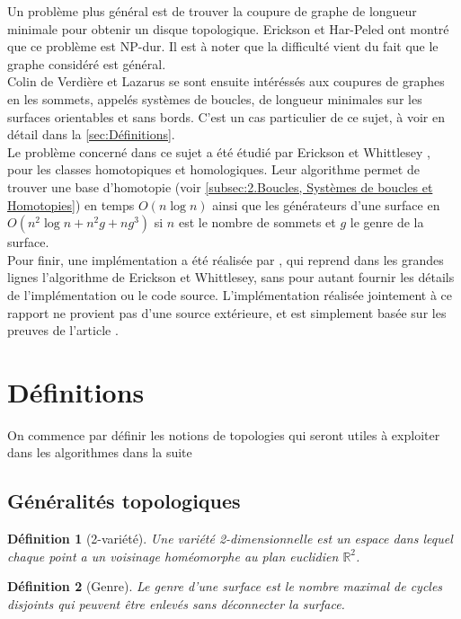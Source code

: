 \documentclass[french]{article}
\newtheorem{Def}{Définition}[section]
\begin{document}
Un problème plus général est de trouver la coupure de graphe de longueur minimale pour obtenir un disque topologique.
Erickson et Har-Peled ont montré que ce problème est NP-dur. Il est à noter que la difficulté vient du fait que le graphe considéré est général. \\
Colin de Verdière et Lazarus \cite{loops} se sont ensuite intéréssés aux coupures de graphes en les sommets, appelés systèmes de boucles, de longueur minimales sur les surfaces orientables et sans bords.
C'est un cas particulier de ce sujet, à voir en détail dans la \autoref{sec:Définitions}. \\
Le problème concerné dans ce sujet a été étudié par Erickson et Whittlesey \cite{erickson_whittlesey}, pour les classes homotopiques et homologiques. 
Leur algorithme permet de trouver une base d'homotopie (voir \autoref{subsec:2.Boucles, Systèmes de boucles et Homotopies}) en temps $O(n \log n)$ ainsi que les générateurs d'une surface en $O(n^2 \log n + n^2g + ng^3)$ si $n$ est le nombre de sommets et $g$ le genre de la surface. \\
Pour finir, une implémentation a été réalisée par \cite{implementation}, qui reprend dans les grandes lignes l'algorithme de Erickson et Whittlesey, sans pour autant fournir les détails de l'implémentation ou le code source.
L'implémentation réalisée jointement à ce rapport ne provient pas d'une source extérieure, et est simplement basée sur les preuves de l'article \cite{erickson_whittlesey}.

\section{Définitions}

On commence par définir les notions de topologies qui seront utiles à exploiter dans les algorithmes dans la suite

\subsection{Généralités topologiques}

\begin{Def}[2-variété]
Une variété 2-dimensionnelle est un espace dans lequel chaque point a un voisinage homéomorphe au plan euclidien $\mathbb{R}^2$.
\end{Def}

\begin{Def}[Genre]
Le genre d'une surface est le nombre maximal de cycles disjoints qui peuvent être enlevés sans déconnecter la surface.
\end{Def}
\end{document}
